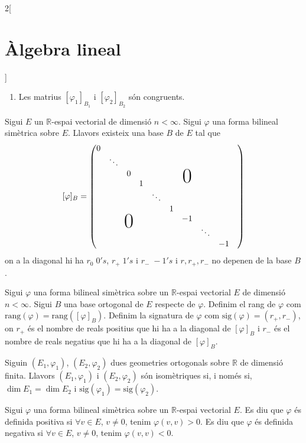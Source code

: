 \documentclass[class=article,10pt,crop=false]{standalone}
\begin{document}
\begin{multicols}{2}[\section{Àlgebra lineal}]
\begin{prop}
\begin{enumerate}
    \item Les matrius $[\varphi_1]_{B_1}$ i $[\varphi_2]_{B_2}$ són congruents.
\end{enumerate}
\end{prop}
\begin{theorem}
Sigui $E$ un $\mathbb{R}$-espai vectorial de dimensió $n<\infty$. Sigui $\varphi$ una forma bilineal simètrica sobre $E$. Llavors existeix una base $B$ de $E$ tal que $$[\varphi]_B=\begin{pmatrix}
0 &&&&&&&&&\\
& \ddots&&&&&&&\\
&& 0&&&&\bigzero&&\\
&&& 1 &&&&&\\
&&&& \ddots &&&&\\
&&&&& 1 &&&\\
&&\bigzero&&&& -1 &&\\
&&&&&&&\ddots &\\
&&&&&&&& -1
\end{pmatrix}$$
on a la diagonal hi ha $r_0\;0's$, $r_+\;1's$ i $r_-\;-1's$ i $r,r_+,r_-$ no depenen de la base $B$.
\end{theorem}
\begin{definition}
Sigui $\varphi$ una forma bilineal simètrica sobre un $\mathbb{R}$-espai vectorial $E$ de dimensió $n<\infty$. Sigui $B$ una base ortogonal de $E$ respecte de $\varphi$. Definim el rang de $\varphi$ com $\text{rang}(\varphi)=\text{rang}([\varphi]_B)$. Definim la signatura de $\varphi$ com $\text{sig}(\varphi)=(r_+,r_-)$, on $r_+$ és el nombre de reals positius que hi ha a la diagonal de $[\varphi]_B$ i $r_-$ és el nombre de reals negatius que hi ha a la diagonal de $[\varphi]_B$.
\end{definition}
\begin{theorem}
Siguin $(E_1,\varphi_1)$, $(E_2,\varphi_2)$ dues geometries ortogonals sobre $\mathbb{R}$ de dimensió finita. Llavors $(E_1,\varphi_1)$ i $(E_2,\varphi_2)$ són isomètriques si, i només si, $\dim E_1=\dim E_2$ i $\text{sig}(\varphi_1)=\text{sig}(\varphi_2)$.
\end{theorem}
\begin{definition}
Sigui $\varphi$ una forma bilineal simètrica sobre un $\mathbb{R}$-espai vectorial $E$. Es diu que $\varphi$ és definida positiva si $\forall v\in E$, $v\ne 0$, tenim $\varphi(v,v)>0$. Es diu que $\varphi$ és definida negativa si $\forall v\in E$, $v\ne 0$, tenim $\varphi(v,v)<0$. 
\end{definition}

\end{multicols}
\end{document}
